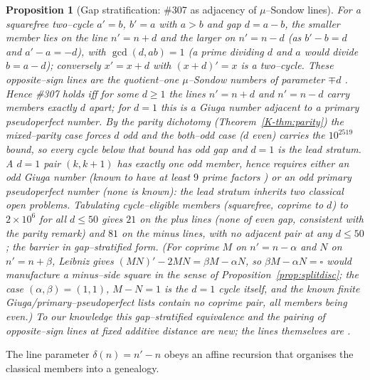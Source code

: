 \documentclass[11pt]{article}
\newtheorem{proposition}[theorem]{Proposition}
\theoremstyle{definition}
\begin{document}
\begin{proposition}[Gap stratification: \#307 as adjacency of $\mu$--Sondow lines]\label{prop:gap}
For a squarefree two--cycle $a'=b$, $b'=a$ with $a>b$ and gap $d=a-b$, the smaller member lies on the line
$n'=n+d$ and the larger on $n'=n-d$ (as $b'-b=d$ and $a'-a=-d$), with $\gcd(d,ab)=1$ (a prime dividing $d$
and $a$ would divide $b=a-d$); conversely $x'=x+d$ with $(x+d)'=x$ is a two--cycle. These opposite--sign
lines are the quotient--one $\mu$--Sondow numbers of parameter $\mp d$ \cite{GrauOllerMarcenSadornil2021}.
Hence \#307 holds iff for some $d\ge1$ the lines $n'=n+d$ and $n'=n-d$ carry members exactly $d$ apart; for
$d=1$ this is \emph{a Giuga number adjacent to a primary pseudoperfect number}. By the parity dichotomy
(Theorem~\ref{K-thm:parity}) the mixed--parity case forces $d$ odd and the both--odd case ($d$ even) carries
the $10^{2519}$ bound, so every cycle below that bound has odd gap and $d=1$ is the lead stratum. A $d=1$
pair $(k,k+1)$ has exactly one odd member, hence requires either an odd Giuga number (known to have at least
$9$ prime factors \cite{BBBG1996,BorweinWong1997}) or an odd primary pseudoperfect number (none is known):
the lead stratum inherits two classical open problems. Tabulating cycle--eligible members (squarefree,
coprime to $d$) to $2\times10^6$ for all $d\le50$ gives $21$ on the plus lines (none of even gap, consistent
with the parity remark) and $81$ on the minus lines, with \emph{no} adjacent pair at any $d\le50$; the
barrier in gap--stratified form. \textup{(}For coprime $M$ on $n'=n-\alpha$ and $N$ on $n'=n+\beta$, Leibniz
gives $(MN)'-2MN=\beta M-\alpha N$, so $\beta M-\alpha N=\square$ would manufacture a minus--side square in
the sense of Proposition~\ref{prop:splitdisc}; the case $(\alpha,\beta)=(1,1)$, $M-N=1$ is the $d=1$ cycle
itself, and the known finite Giuga/primary--pseudoperfect lists contain no coprime pair, all members being
even.\textup{)} To our knowledge this gap--stratified equivalence and the pairing of opposite--sign lines at
fixed additive distance are new; the lines themselves are \cite{GrauOllerMarcenSadornil2021}.
\end{proposition}

The line parameter $\delta(n)=n'-n$ obeys an affine recursion that organises the classical members into a
genealogy.
\end{document}
